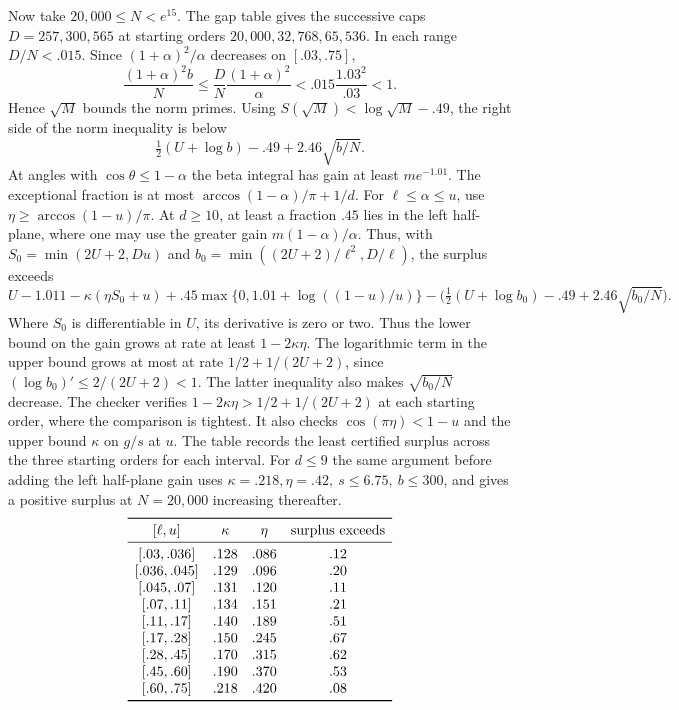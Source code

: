 Now take \(20{,}000\le N<e^{15}\). The gap table gives the
successive caps \(D=257,300,565\) at starting orders
\(20{,}000,32{,}768,65{,}536\). In each range \(D/N<.015\).
Since \((1+\alpha)^2/\alpha\) decreases on \([.03,.75]\),
\[
 \frac{(1+\alpha)^2b}{N}
 \le\frac D N\frac{(1+\alpha)^2}{\alpha}
 <.015\frac{1.03^2}{.03}<1.
\]
Hence \(\sqrt M\) bounds the norm primes. Using
\(S(\sqrt M)<\log\sqrt M-.49\), the right side of the norm inequality is below
\begin{equation}\label{eq:moderate-high-norm}
 \tfrac12(U+\log b)-.49+2.46\sqrt{b/N}.
\end{equation}
At angles with \(\cos\theta\le1-\alpha\) the beta integral
has gain at least \(me^{-1.01}\). The exceptional fraction
is at most \(\arccos(1-\alpha)/\pi+1/d\). For
\(\ell\le\alpha\le u\), use \(\eta\ge\arccos(1-u)/\pi\).
At \(d\ge10\), at least a fraction \(.45\) lies in the left
half-plane, where one may use the greater gain \(m(1-\alpha)/\alpha\).
Thus, with \(S_0=\min(2U+2,Du)\) and
\(b_0=\min((2U+2)/\ell^2,D/\ell)\), the surplus exceeds
\[
 U-1.011-\kappa(\eta S_0+u)
  +.45\max\{0,1.01+\log((1-u)/u)\}
  -\bigl(\tfrac12(U+\log b_0)-.49+2.46\sqrt{b_0/N}\bigr).
\]
Where \(S_0\) is differentiable in \(U\), its derivative is
zero or two. Thus the lower bound on the gain grows at rate
at least \(1-2\kappa\eta\). The logarithmic term in the
upper bound grows at most at rate \(1/2+1/(2U+2)\), since
\((\log b_0)'\le2/(2U+2)<1\). The latter inequality also
makes \(\sqrt{b_0/N}\) decrease. The checker verifies
\(1-2\kappa\eta>1/2+1/(2U+2)\) at each starting order,
where the comparison is tightest. It also checks
\(\cos(\pi\eta)<1-u\) and the upper bound \(\kappa\)
on \(g/s\) at \(u\). The table records the least certified
surplus across the three starting orders for each interval.
For \(d\le9\) the same argument before adding the left half-plane
gain uses \(\kappa=.218,\eta=.42,\ s\le6.75,\ b\le300\),
and gives a positive surplus at \(N=20{,}000\) increasing thereafter.
\[
\begin{array}{cccc}
\toprule
{[\ell,u]}&\kappa&\eta&\text{surplus exceeds}\\
\midrule
{[.03,.036]}&.128&.086&.12\\
{[.036,.045]}&.129&.096&.20\\
{[.045,.07]}&.131&.120&.11\\
{[.07,.11]}&.134&.151&.21\\
{[.11,.17]}&.140&.189&.51\\
{[.17,.28]}&.150&.245&.67\\
{[.28,.45]}&.170&.315&.62\\
{[.45,.60]}&.190&.370&.53\\
{[.60,.75]}&.218&.420&.08\\
\bottomrule
\end{array}
\]


